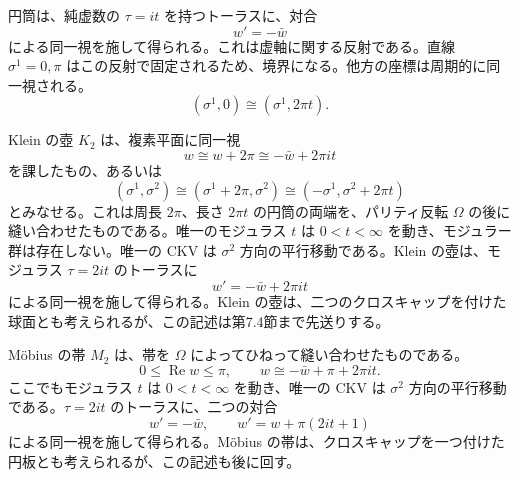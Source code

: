 円筒は、純虚数の $\tau=it$ を持つトーラスに、対合
\begin{equation}
w'=-\bar w
\tag{7.1.6}\label{eq:7.1.6}
\end{equation}
による同一視を施して得られる。これは虚軸に関する反射である。直線 $\sigma^1=0,\pi$ はこの反射で固定されるため、境界になる。他方の座標は周期的に同一視される。
\begin{equation}
(\sigma^1,0)\cong(\sigma^1,2\pi t).
\tag{7.1.7}\label{eq:7.1.7}
\end{equation}


Klein の壺 $K_2$ は、複素平面に同一視
\begin{equation}
w\cong w+2\pi\cong-\bar w+2\pi it
\tag{7.1.8}\label{eq:7.1.8}
\end{equation}
を課したもの、あるいは
\begin{equation}
(\sigma^1,\sigma^2)\cong(\sigma^1+2\pi,\sigma^2)
\cong(-\sigma^1,\sigma^2+2\pi t)
\tag{7.1.9}\label{eq:7.1.9}
\end{equation}
とみなせる。これは周長 $2\pi$、長さ $2\pi t$ の円筒の両端を、パリティ反転 $\Omega$ の後に縫い合わせたものである。唯一のモジュラス $t$ は $0<t<\infty$ を動き、モジュラー群は存在しない。唯一の CKV は $\sigma^2$ 方向の平行移動である。Klein の壺は、モジュラス $\tau=2it$ のトーラスに
\begin{equation}
w'=-\bar w+2\pi it
\tag{7.1.10}\label{eq:7.1.10}
\end{equation}
による同一視を施して得られる。Klein の壺は、二つのクロスキャップを付けた球面とも考えられるが、この記述は第7.4節まで先送りする。


Möbius の帯 $M_2$ は、帯を $\Omega$ によってひねって縫い合わせたものである。
\begin{equation}
0\leq\operatorname{Re}w\leq\pi,\qquad
w\cong-\bar w+\pi+2\pi it.
\tag{7.1.11}\label{eq:7.1.11}
\end{equation}
ここでもモジュラス $t$ は $0<t<\infty$ を動き、唯一の CKV は $\sigma^2$ 方向の平行移動である。$\tau=2it$ のトーラスに、二つの対合
\begin{equation}
w'=-\bar w,\qquad w'=w+\pi(2it+1)
\tag{7.1.12}\label{eq:7.1.12}
\end{equation}
による同一視を施して得られる。Möbius の帯は、クロスキャップを一つ付けた円板とも考えられるが、この記述も後に回す。


